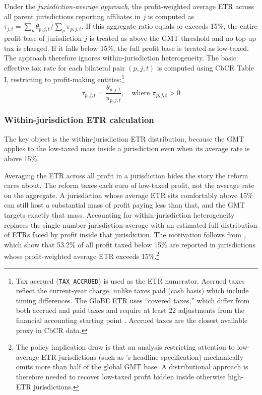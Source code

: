 \documentclass[11pt,a4paper]{article}
\newcommand{\code}[1]{\texttt{#1}}
\begin{document}
Under the \emph{jurisdiction-average approach}, the profit-weighted average ETR across all parent jurisdictions reporting affiliates in $j$ is computed as $\bar{\tau}_{j,t} = \sum_p \theta_{p,j,t} / \sum_p \pi_{p,j,t}$. If this aggregate ratio equals or exceeds 15\%, the entire profit base of jurisdiction $j$ is treated as above the GMT threshold and no top-up tax is charged. If it falls below 15\%, the full profit base is treated as low-taxed. The approach therefore ignores within-jurisdiction heterogeneity. The basic effective tax rate for each bilateral pair $(p, j, t)$ is computed using CbCR Table I, restricting to profit-making entities:\footnote{Tax accrued (\code{TAX\_ACCRUED}) is used as the ETR numerator. Accrued taxes reflect the current-year charge, unlike taxes paid (cash basis) which include timing differences. The GloBE ETR uses ``covered taxes,'' which differ from both accrued and paid taxes and require at least 22 adjustments from the financial accounting starting point \citep{hanlon2023}. Accrued taxes are the closest available proxy in CbCR data.}
\begin{equation}\label{eq:etr}
\tau_{p,j,t} = \frac{\theta_{p,j,t}}{\pi_{p,j,t}}, \quad \text{where } \pi_{p,j,t} > 0
\end{equation}

\subsubsection{Within-jurisdiction ETR calculation}\label{sec:distributional}

The key object is the within-jurisdiction ETR distribution, because the GMT applies to the low-taxed mass inside a jurisdiction even when its average rate is above 15\%.

Averaging the ETR across all profit in a jurisdiction hides the story the reform cares about. The reform taxes each euro of low-taxed profit, not the average rate on the aggregate. A jurisdiction whose average ETR sits comfortably above 15\% can still host a substantial mass of profit paying less than that, and the GMT targets exactly that mass. Accounting for within-jurisdiction heterogeneity replaces the single-number jurisdiction-average with an estimated full distribution of ETRs faced by profit inside that jurisdiction. The motivation follows from \citet{hugger2026}, which show that 53.2\% of all profit taxed below 15\% are reported in jurisdictions whose profit-weighted average ETR exceeds 15\%.\footnote{The policy implication \citet{hugger2026} draw is that an analysis restricting attention to low-average-ETR jurisdictions (such as \citet{barake2022}'s headline specification) mechanically omits more than half of the global GMT base. A distributional approach is therefore needed to recover low-taxed profit hidden inside otherwise high-ETR jurisdictions.} 
\end{document}
